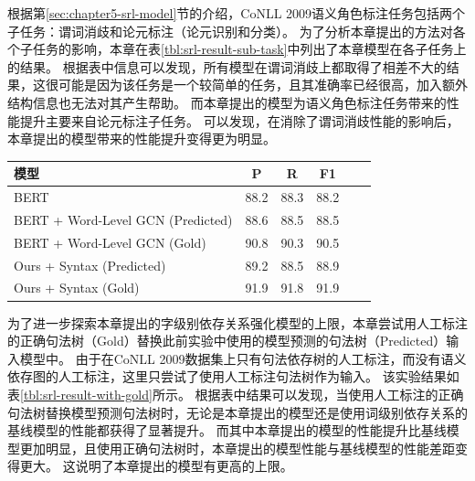 根据第\ref{sec:chapter5-srl-model}节的介绍，CoNLL 2009语义角色标注任务包括两个子任务：谓词消歧和论元标注（论元识别和分类）。
为了分析本章提出的方法对各个子任务的影响，本章在表\ref{tbl:srl-result-sub-task}中列出了本章模型在各子任务上的结果。
根据表中信息可以发现，所有模型在谓词消歧上都取得了相差不大的结果，这很可能是因为该任务是一个较简单的任务，且其准确率已经很高，加入额外结构信息也无法对其产生帮助。
而本章提出的模型为语义角色标注任务带来的性能提升主要来自论元标注子任务。
可以发现，在消除了谓词消歧性能的影响后，本章提出的模型带来的性能提升变得更为明显。

\begin{table}[htpb]
    \vspace{0.5em}\centering\wuhao
    \begin{tabular}{lccccc}
        \toprule[1.5pt]
        模型 & P & R & F1 \\
        \midrule[1pt]
        BERT                               & 88.2 & 88.3 & 88.2 \\
        BERT + Word-Level GCN (Predicted)  & 88.6 & 88.5 & 88.5 \\
        BERT + Word-Level GCN (Gold)       & 90.8 & 90.3 & 90.5 \\
        Ours + Syntax (Predicted)          & 89.2 & 88.5 & 88.9 \\
        Ours + Syntax (Gold)               & 91.9 & 91.8 & 91.9 \\
        \bottomrule[1.5pt]
    \end{tabular}
\end{table}

为了进一步探索本章提出的字级别依存关系强化模型的上限，本章尝试用人工标注的正确句法树（Gold）替换此前实验中使用的模型预测的句法树（Predicted）输入模型中。
由于在CoNLL 2009数据集上只有句法依存树的人工标注，而没有语义依存图的人工标注，这里只尝试了使用人工标注句法树作为输入。
该实验结果如表\ref{tbl:srl-result-with-gold}所示。
根据表中结果可以发现，当使用人工标注的正确句法树替换模型预测句法树时，无论是本章提出的模型还是使用词级别依存关系的基线模型的性能都获得了显著提升。
而其中本章提出的模型的性能提升比基线模型更加明显，且使用正确句法树时，本章提出的模型性能与基线模型的性能差距变得更大。
这说明了本章提出的模型有更高的上限。

